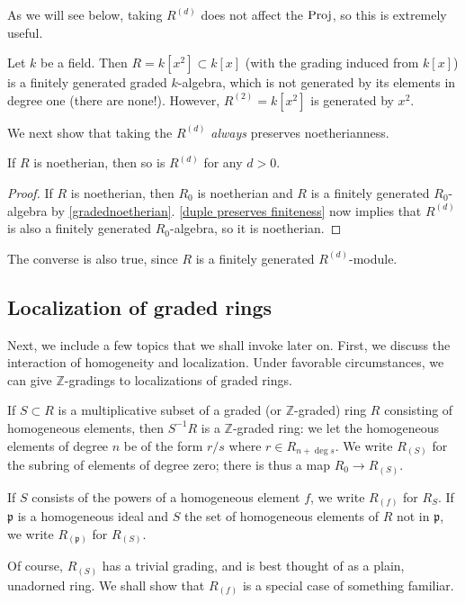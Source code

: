 As we will see below, taking $R^{(d)}$ does not affect the $\operatorname{Proj}$, so this is
extremely useful.

\begin{example} Let $k$ be a field. Then 
$R = k[x^2] \subset k[x]$ (with the grading induced from $k[x]$) is a finitely generated graded $k$-algebra,
which is not generated by its elements in degree one (there are none!).
However, $R^{(2)} = k[x^2]$ is generated by $x^2$.
\end{example} 


We next show that taking the $R^{(d)}$ \emph{always} preserves noetherianness.

\begin{proposition} \label{filtnoetherian}
If $R$ is noetherian, then so is $R^{(d)}$ for any $d>0$.
\end{proposition} 
\begin{proof} 
If $R$ is noetherian, then $R_0$ is noetherian and $R$ is a finitely generated
$R_0$-algebra by \cref{gradednoetherian}.  \cref{duple preserves
finiteness}  now implies that $R^{(d)} $ is also a
finitely generated $R_0$-algebra, so it is noetherian.
\end{proof} 

The converse is also true, since $R$ is a finitely generated $R^{(d)}$-module.




\subsection{Localization of graded rings}
Next, we include a few topics that we shall invoke later on. 
First, we discuss the interaction of homogeneity and localization.
Under favorable circumstances, we can give $\mathbb{Z}$-gradings to localizations of
graded rings.

\begin{definition}
If $S \subset R$ is a multiplicative subset of a graded (or
$\mathbb{Z}$-graded) ring $R$ consisting of homogeneous elements, then $S^{-1}
R$ is a $\mathbb{Z}$-graded ring: we let the homogeneous elements of
degree $n$ be of the form $r/s$ where $r \in R_{n + \deg s}$.  We write $R_{(S)}$ for the subring of
elements of degree zero; there is thus a map $R_0 \to R_{(S)}$.

If $S$ consists of the powers of a homogeneous element $f$, we write $R_{(f)}$
for $R_S$. If $\mathfrak{p}$ is a homogeneous ideal and $S$ the set of
homogeneous elements of $R$ not in $\mathfrak{p}$, we write
$R_{(\mathfrak{p})}$ for $R_{(S)}$.
\end{definition}
Of course, $R_{(S)}$ has a trivial grading, and is best thought of as a
plain, unadorned ring.
We shall show that $R_{(f)}$ is a special case of something familiar.


